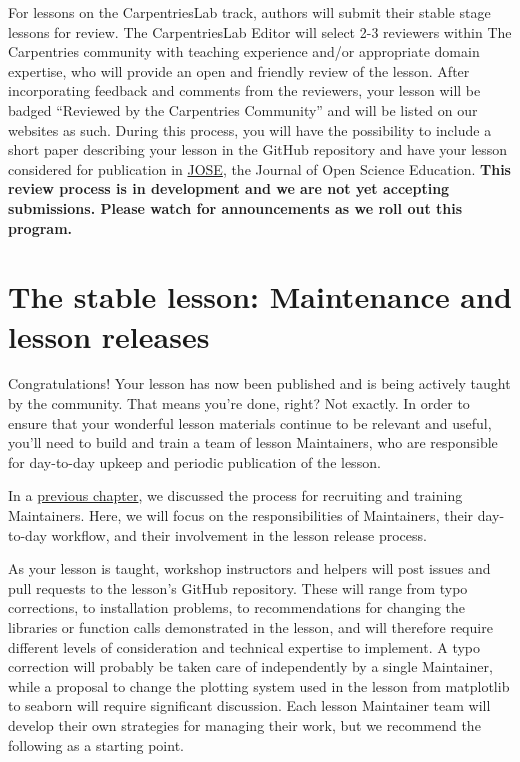 \documentclass[
]{book}
\begin{document}
For lessons on the CarpentriesLab track, authors will submit their stable stage lessons for review.
The CarpentriesLab Editor will select 2-3 reviewers within The Carpentries community with teaching experience
and/or appropriate domain expertise, who will provide an open and friendly review of the lesson.
After incorporating feedback and comments from the reviewers, your lesson will be badged
``Reviewed by the Carpentries Community'' and will be listed on our websites as such. During this process,
you will have the possibility to include a short paper describing your
lesson in the GitHub repository and have your lesson considered for publication in
\href{http://jose.theoj.org/}{JOSE}, the Journal of Open Science Education.
\textbf{This review process is in development and we are not yet accepting submissions. Please watch for
announcements as we roll out this program.}

\hypertarget{the-stable-lesson-maintenance-and-lesson-releases}{%
\section{The stable lesson: Maintenance and lesson releases}\label{the-stable-lesson-maintenance-and-lesson-releases}}

Congratulations! Your lesson has now been published and is being actively taught by the community.
That means you're done, right? Not exactly. In order to ensure that your wonderful lesson materials
continue to be relevant and useful, you'll need to build and train a team of lesson Maintainers, who
are responsible for day-to-day upkeep and periodic publication of the lesson.

In a \href{community-development-roles\#lesson-maintainers}{previous chapter}, we discussed the process for recruiting and training Maintainers. Here, we
will focus on the responsibilities of Maintainers, their day-to-day workflow, and their involvement
in the lesson release process.

As your lesson is taught, workshop instructors and helpers will post issues and pull requests to
the lesson's GitHub repository. These will range from typo corrections, to installation problems,
to recommendations for changing the libraries or function calls demonstrated in the lesson, and will
therefore require different levels of consideration and technical expertise to implement. A typo
correction will probably be taken care of independently by a single Maintainer,
while a proposal to change
the plotting system used in the lesson from matplotlib to seaborn will require significant
discussion. Each lesson Maintainer team will develop their own strategies for managing their work,
but we recommend the following as a starting point.
\end{document}
